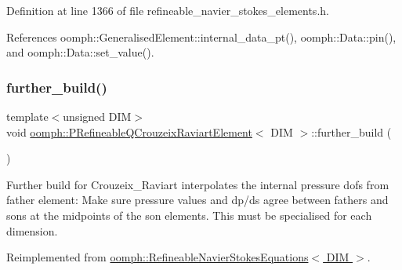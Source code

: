 Definition at line 1366 of file refineable\+\_\+navier\+\_\+stokes\+\_\+elements.\+h.



References oomph\+::\+Generalised\+Element\+::internal\+\_\+data\+\_\+pt(), oomph\+::\+Data\+::pin(), and oomph\+::\+Data\+::set\+\_\+value().

\mbox{\label{classoomph_1_1PRefineableQCrouzeixRaviartElement_a3129fe3450caf60d2f678024d7bf7f08}} 
\subsubsection{\texorpdfstring{further\+\_\+build()}{further\_build()}\hspace{0.1cm}{\footnotesize\ttfamily [1/3]}}
{\footnotesize\ttfamily template$<$unsigned D\+IM$>$ \\
void \hyperlink{classoomph_1_1PRefineableQCrouzeixRaviartElement}{oomph\+::\+P\+Refineable\+Q\+Crouzeix\+Raviart\+Element}$<$ D\+IM $>$\+::further\+\_\+build (\begin{DoxyParamCaption}{ }\end{DoxyParamCaption})\hspace{0.3cm}{\ttfamily [virtual]}}

Further build for Crouzeix\+\_\+\+Raviart interpolates the internal pressure dofs from father element\+: Make sure pressure values and dp/ds agree between fathers and sons at the midpoints of the son elements. This must be specialised for each dimension. 

Reimplemented from \hyperlink{classoomph_1_1RefineableNavierStokesEquations_a7afd6250585ea597c3df65b8c7744da4}{oomph\+::\+Refineable\+Navier\+Stokes\+Equations$<$ D\+I\+M $>$}.

\mbox{\label{classoomph_1_1PRefineableQCrouzeixRaviartElement_a98e341f00435e0c9b81c0615412bd734}} 
